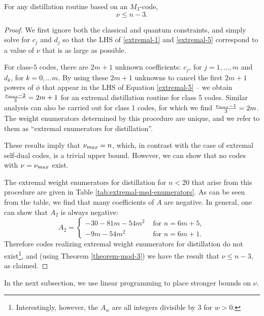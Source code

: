 \documentclass[11pt]{article}
\begin{document}
\begin{theorem}
   For any distillation routine based on an $M_3$-code, 
   \begin{equation}
   \nu \leq n-3.
   \end{equation} \label{thm:extremal-no-go}
\end{theorem}
\begin{proof}
We first ignore both the classical and quantum constraints, and simply solve for $c_j$ and $d_j$ so that the LHS of \eqref{extremal-1} and \eqref{extremal-5} correspond to a value of $\nu$ that is as large as possible.

For class-$5$ codes, there are $2m+1$ unknown coefficients: $c_j$, for $j=1, \ldots, m$ and $d_k$, for $k=0, \ldots m$. By using these $2m+1$ unknowns to cancel the first $2m+1$ powers of $\phi$ that appear in the LHS of Equation \eqref{extremal-5}  -- we obtain $\frac{\nu_{\rm max}-2}{3}=2m+1$ for an extremal distillation routine for class 5 codes. Similar analysis can also be carried out for class 1 codes, for which we find $\frac{\nu_{\rm max}-1}{3}=2m$. The weight enumerators determined by this procedure are unique, and we refer to them as ``extremal enumerators for distillation''.

These results imply that $\nu_{\rm max}=n$, which, in contrast with the case of extremal self-dual codes, is a trivial upper bound. However, we can show that no codes with $\nu=\nu_{\rm max}$ exist. 

The extremal weight enumerators for distillation for $n<20$ that arise from this procedure are given in Table \ref{tab:extremal-msd-enumerators}. As can be seen from the table, we find that many coefficients of $A$ are negative. In general, one can show that $A_2$ is always negative:
\begin{equation}
    A_2 = \begin{cases} -30 - 81 m - 54 m^2 & \text{ for } n=6m+5, \\
    -9m - 54 m^2 & \text{ for } n =6m+1.
    \end{cases}
\end{equation}
 Therefore codes realizing extremal weight enumerators for distillation do not exist\footnote{Interestingly, however, the $A_w$ are all integers divisible by $3$ for $w >0$.}, and (using Theorem \ref{theorem-mod-3}) we have the result that $\nu \leq n-3$, as claimed. 
\end{proof}


In the next subsection, we use linear programming to place stronger bounds on $\nu$.
\end{document}

